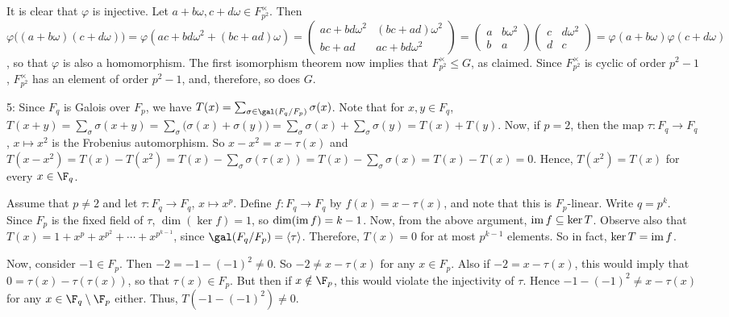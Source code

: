 \documentclass[12pt]{article}
\begin{document}
It is clear that $\varphi$ is injective. Let $a+b \omega ,c+d \omega \in F_{p^2}^\times$. Then $\varphi\bigl((a+b\omega)(c+d\omega)\bigr) = \varphi(ac+bd\omega^2+(bc+ad)\omega) = \begin{pmatrix}ac+bd\omega^2 & (bc+ad)\omega^2 \\ bc+ad & ac+bd\omega^2 \end{pmatrix} = \begin{pmatrix}a & b\omega^2 \\ b & a\end{pmatrix} \begin{pmatrix}c & d\omega^2 \\ d & c \end{pmatrix} = \varphi(a+b\omega) \varphi(c+d\omega)$, so that $\varphi$ is also a homomorphism. The first isomorphism theorem now implies that $F_{p^2}^\times\le G$, as claimed. Since $F_{p^2}^\times$ is cyclic of order $p^2-1$, $F_{p^2}^\times$ has an element of order $p^2-1$, and, therefore, so does $G$. \newline

5: Since $F_q$ is Galois over $F_p$, we have $T(x)=\sum_{\sigma\in\gal(F_q/F_p)}\sigma(x)$. Note that for $x,y\in F_q$, $T(x+y)=\sum_{\sigma}\sigma(x+y)=\sum_{\sigma}\bigl(\sigma(x)+\sigma(y)\bigr)=\sum_{\sigma}\sigma(x)+\sum_{\sigma}\sigma(y)=T(x)+T(y).$ Now, if $p=2$, then the map $\tau:F_q \to F_q$, $x \mapsto x^2$ is the Frobenius automorphism. So $x-x^2=x-\tau(x)$ and $T(x-x^2) = T(x)-T(x^2) = T(x)-\sum_{\sigma}\sigma(\tau(x)) = T(x)-\sum_\sigma\sigma(x) = T(x)-T(x)=0.$ Hence, $T(x^2)=T(x)$ for every $x\in\F_q$. \newline

Assume that $p\neq 2$ and let $\tau:F_q \to F_q$, $x \mapsto x^p$. Define $f:F_q \to F_q$ by $f(x)=x-\tau(x)$, and note that this is $F_p$-linear. Write $q=p^k$. Since $F_p$ is the fixed field of $\tau$, $\dim(\ker{f})=1$, so $\dim({\rm im}\,f)=k-1$. Now, from the above argument, ${\rm im}\,f\subseteq\ker{T}$. Observe also that $T(x)=1+x^p+x^{p^2}+\dotsb+x^{p^{k-1}}$, since $\gal(F_q/F_p)=\langle \tau\rangle$. Therefore, $T(x)=0$ for at most $p^{k-1}$ elements. So in fact, $\ker{T}={\rm im}\,f$.

Now, consider $-1 \in F_p$. Then $-2=-1-(-1)^2\neq0$. So $-2\neq x-\tau(x)$ for any $x \in F_p$. Also if $-2=x-\tau(x)$, this would imply that  $0=\tau(x)-\tau(\tau(x))$, so that $\tau(x) \in F_p$. But then if $x\notin\F_p$, this would violate the injectivity of $\tau$. Hence $-1-(-1)^2\neq x-\tau(x)$ for any $x\in\F_q\setminus\F_p$ either. Thus, $T(-1-(-1)^2)\neq0$. \newline
\end{document}
